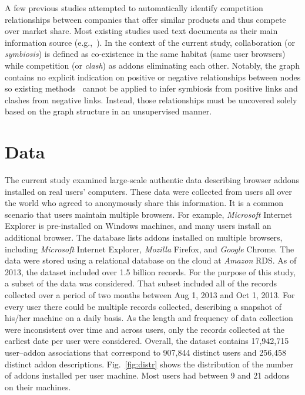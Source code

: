 \documentclass[10pt,letterpaper]{article}
\begin{document}
A few previous studies attempted to automatically identify competition relationships between companies that offer similar products and thus compete over market share. Most existing studies used text documents as their main information source (e.g.,~\cite{baoTKDE08,yangCIKM12}). In the context of the current study, collaboration (or \textit{symbiosis}) is defined as co-existence in the same habitat (same user browsers) while competition (or \textit{clash}) as addons eliminating each other. Notably, the graph contains no explicit indication on positive or negative relationships between nodes so existing methods~\cite{kunegisWWW08,kerchoveICDM08} cannot be applied to infer symbiosis from positive links and clashes from negative links. Instead, those relationships must be uncovered solely based on the graph structure in an unsupervised manner.


\section*{Data}

The current study examined large-scale authentic data describing browser addons installed on real users' computers. These data were collected from users all over the world who agreed to anonymously share this information. It is a common scenario that users maintain multiple browsers. For example, \textit{Microsoft} Internet Explorer is pre-installed on Windows machines, and many users install an additional browser. The database lists addons installed on multiple browsers, including \textit{Microsoft} Internet Explorer, \textit{Mozilla} Firefox, and \textit{Google} Chrome. The data were stored using a relational database on the cloud at \textit{Amazon} RDS. As of 2013, the dataset included over 1.5 billion records. For the purpose of this study, a subset of the data was considered. That subset included all of the records collected over a period of two months between Aug 1, 2013 and Oct 1, 2013. For every user there could be multiple records collected, describing a snapshot of his/her machine on a daily basis. As the length and frequency of data collection were inconsistent over time and across users, only the records collected at the earliest date per user were considered. Overall, the dataset contains 17,942,715 user--addon associations that correspond to 907,844 distinct users and 256,458 distinct addon descriptions. Fig.~\ref{fig:distr} shows the distribution of the number of addons installed per user machine. Most users had between 9 and 21 addons on their machines.
\end{document}
